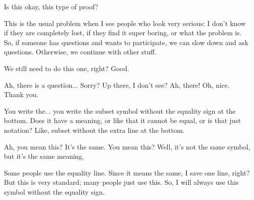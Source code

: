 \begin{speech}[00:52:28 - 00:53:26]
Is this okay, this type of proof?

This is the usual problem when I see people who look very serious: I don't know if they are completely lost, if they find it super boring, or what the problem is. So, if someone has questions and wants to participate, we can slow down and ask questions. Otherwise, we continue with other stuff.

We still need to do this one, right?  Good.

Ah, there is a question... Sorry? Up there, I don't see? Ah, there! Oh, nice. Thank you. 
\end{speech}

\begin{student}
You write the... you write the subset symbol without the equality sign at the bottom. Does it have a meaning, or like that it cannot be equal, or is that just notation? Like, subset without the extra line at the bottom.
\end{student}

\begin{speech}[00:53:38 - 00:54:06]
Ah, you mean this?  It's the same. You mean this?  Well, it's not the same symbol, but it's the same meaning.

Some people use the equality line. Since it means the same, I save one line, right? But this is very standard; many people just use this. So, I will always use this  symbol without the equality sign.
\end{speech}

\begin{content}
\end{content}

